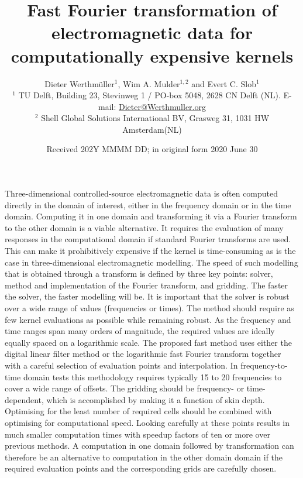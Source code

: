 \documentclass[extra, camera,%
    onecolumn,   %
    referee,     %
]{gji}
\title[Transforming expensive EM kernels]{Fast Fourier transformation
of electromagnetic data for computationally expensive kernels}
\author[D. Werthmüller \emph{et al.}]
  {\Large
   Dieter Werthmüller$^1$,     %
   Wim A. Mulder$^{1,2}$ and   %
   Evert C. Slob$^1$           %
   \\
   {\footnotesize
    $^1$ TU Delft, Building 23, Stevinweg 1 / PO-box 5048, 2628 CN Delft (NL).
    E-mail: \href{mailto:Dieter@Werthmuller.org}{Dieter@Werthmuller.org}
   }\\[-.3em]
   {\footnotesize
    $^2$ Shell Global Solutions International BV, Grasweg 31, 1031 HW
    Amsterdam(NL)
   }
  }
\date{Received 202Y MMMM DD; in original form 2020 June 30}
\makeatletter
\let\zz@tabular\@tabular
\let\zzendtabular\endtabular
\let\zz@xtabularcr\@xtabularcr
\let\zz@tabclassz\@tabclassz
\let\zz@tabclassiv \@tabclassiv
\let\zz@tabarray\@tabarray
\makeatother
\begin{document}
\label{firstpage}

{\makeatletter
\let\@tabular\zz@tabular
\let\endtabular\zzendtabular
\let\@xtabularcr\zz@xtabularcr
\let\@tabclassz\zz@tabclassz
\let\@tabclassiv \zz@tabclassiv 
\let\@tabarray\zz@tabarray
\maketitle
}

\begin{summary}
%
Three-dimensional controlled-source electromagnetic data is often computed
directly in the domain of interest, either in the frequency domain or in the
time domain. Computing it in one domain and transforming it via a Fourier
transform to the other domain is a viable alternative. It requires the
evaluation of many responses in the computational domain if standard Fourier
transforms are used. This can make it prohibitively expensive if the kernel is
time-consuming as is the case in three-dimensional electromagnetic modelling.
The speed of such modelling that is obtained through a transform is defined by
three key points: solver, method and implementation of the Fourier
transform, and gridding.
%
The faster the solver, the faster modelling will be. It is important that the
solver is robust over a wide range of values (frequencies or times). The method
should require as few kernel evaluations as possible while remaining robust. As
the frequency and time ranges span many orders of magnitude, the required
values are ideally equally spaced on a logarithmic scale. The proposed fast
method uses either the digital linear filter method or the logarithmic fast
Fourier transform together with a careful selection of evaluation points and
interpolation. In frequency-to-time domain tests this methodology requires
typically 15 to 20 frequencies to cover a wide range of offsets.
%
The gridding should be frequency- or time-dependent, which is accomplished by
making it a function of skin depth. Optimising for the least number of required
cells should be combined with optimising for computational speed. Looking
carefully at these points results in much smaller computation times with
speedup factors of ten or more over previous methods. A computation in one
domain followed by transformation can therefore be an alternative to
computation in the other domain domain if the required evaluation points and
the corresponding grids are carefully chosen.
%
\end{summary}
\end{document}

